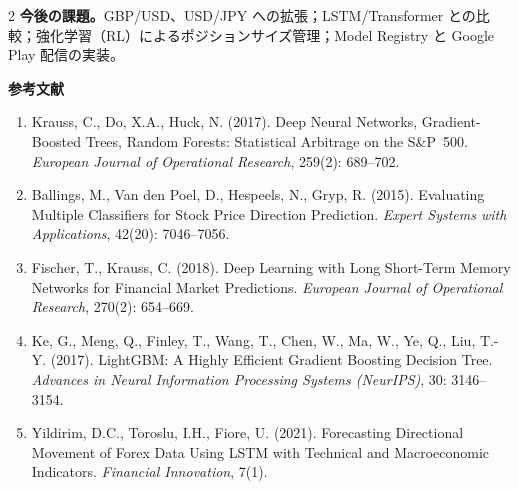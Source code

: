 \begin{multicols*}{2}
\textbf{今後の課題。}GBP/USD、USD/JPY への拡張；LSTM/Transformer との比較；強化学習（RL）によるポジションサイズ管理；Model Registry と Google Play 配信の実装。

\noindent\textbf{参考文献}

\begingroup
\scriptsize
\setlength{\parskip}{2pt}
\begin{enumerate}\setlength\itemsep{1pt}\setlength\parsep{0pt}\setlength\topsep{0pt}
    \item Krauss, C., Do, X.A., Huck, N. (2017). Deep Neural Networks, Gradient-Boosted Trees, Random Forests: Statistical Arbitrage on the S\&P~500. \emph{European Journal of Operational Research}, 259(2): 689--702.
    \item Ballings, M., Van den Poel, D., Hespeels, N., Gryp, R. (2015). Evaluating Multiple Classifiers for Stock Price Direction Prediction. \emph{Expert Systems with Applications}, 42(20): 7046--7056.
    \item Fischer, T., Krauss, C. (2018). Deep Learning with Long Short-Term Memory Networks for Financial Market Predictions. \emph{European Journal of Operational Research}, 270(2): 654--669.
    \item Ke, G., Meng, Q., Finley, T., Wang, T., Chen, W., Ma, W., Ye, Q., Liu, T.-Y. (2017). LightGBM: A Highly Efficient Gradient Boosting Decision Tree. \emph{Advances in Neural Information Processing Systems (NeurIPS)}, 30: 3146--3154.
    \item Yildirim, D.C., Toroslu, I.H., Fiore, U. (2021). Forecasting Directional Movement of Forex Data Using LSTM with Technical and Macroeconomic Indicators. \emph{Financial Innovation}, 7(1).
\end{enumerate}
\endgroup

\end{multicols*}
